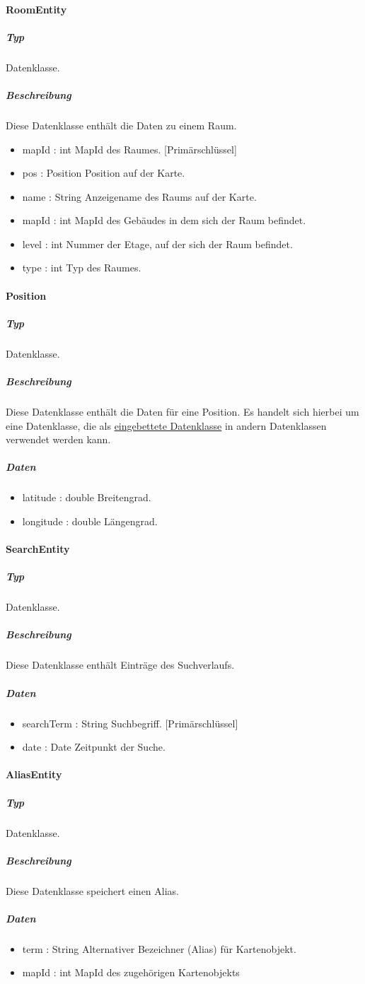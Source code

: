 \paragraph{RoomEntity}
\subparagraph*{Typ}
Datenklasse.
\subparagraph*{Beschreibung}
Diese Datenklasse enthält die Daten zu einem Raum.
\begin{itemize}
    \item mapId : int MapId des Raumes. [Primärschlüssel]
    \item pos : Position Position auf der Karte.
    \item name : String Anzeigename des Raums auf der Karte.
    \item mapId : int MapId des Gebäudes in dem sich der Raum befindet.
    \item level : int Nummer der Etage, auf der sich der Raum befindet.
    \item type : int Typ des Raumes.
\end{itemize}

\paragraph{Position}
\subparagraph*{Typ}
Datenklasse.
\subparagraph*{Beschreibung}
Diese Datenklasse enthält die Daten für eine Position.
Es handelt sich hierbei um eine Datenklasse, die als \href{https://developer.android.com/reference/android/arch/persistence/room/Embedded}
{eingebettete Datenklasse} in andern Datenklassen verwendet werden kann. 
\subparagraph*{Daten}
\begin{itemize}
    \item latitude : double Breitengrad.
    \item longitude : double Längengrad.
\end{itemize}

\paragraph{SearchEntity}
\subparagraph*{Typ}
Datenklasse.
\subparagraph*{Beschreibung}
Diese Datenklasse enthält Einträge des Suchverlaufs.
\subparagraph*{Daten}
\begin{itemize}
    \item searchTerm : String Suchbegriff. [Primärschlüssel]
    \item date : Date Zeitpunkt der Suche.
\end{itemize}

\paragraph{AliasEntity}
\subparagraph*{Typ}
Datenklasse.
\subparagraph*{Beschreibung}
Diese Datenklasse speichert einen Alias.
\subparagraph*{Daten}
\begin{itemize}
    \item term : String Alternativer Bezeichner (Alias) für Kartenobjekt.
    \item mapId : int MapId des zugehörigen Kartenobjekts
\end{itemize}